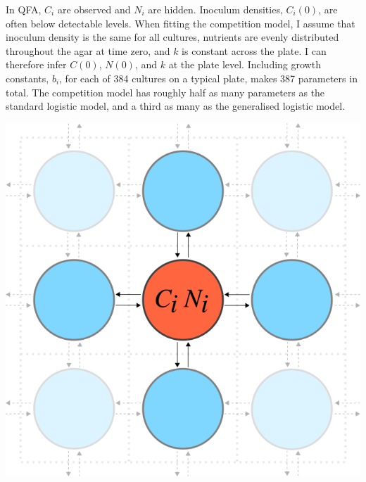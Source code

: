 In QFA, \(C_{i}\) are observed and \(N_{i}\) are hidden. Inoculum
densities, \(C_{i}(0)\), are often below detectable levels. When
fitting the competition model, I assume that inoculum density is the
same for all cultures, nutrients are evenly distributed throughout the
agar at time zero, and \(k\) is constant across the plate. I can
therefore infer \(C(0)\), \(N(0)\), and \(k\) at the plate
level. Including growth constants, \(b_{i}\), for each of 384 cultures
on a typical plate, makes 387 parameters in total. The competition
model has roughly half as many parameters as the standard logistic
model, and a third as many as the generalised logistic model.
\begin{Figure}
  \centering
  \includegraphics[width=\linewidth]{comp_model/comp_model_schematic2}
  \label{fig:comp_model_schematic}
\end{Figure}

